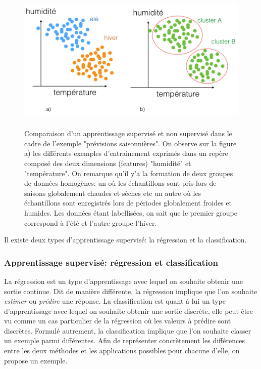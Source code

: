 \begin{figure}[h]
	\centering\includegraphics[height=7cm]{images/apprentissage_meteo.jpeg}
	\caption[Comparaison d'un apprentissage supervisé et non supervisé dans le cadre de l'exemple "prévisions saisonnières"]{Comparaison d'un apprentissage supervisé et non supervisé dans le cadre de l'exemple "prévisions saisonnières". On observe sur la figure a) les différents exemples d'entrainement exprimés dans un repère composé des deux dimensions (features) "humidité" et "température". On remarque qu'il y'a la formation de deux groupes de données homogènes: un où les échantillons sont pris lors de saisons globalement chaudes et sèches etc un autre où les échantillons sont enregistrés lors de périodes globalement froides et humides. Les données étant labellisées, on sait que le premier groupe correspond à l'été et l'autre groupe l'hiver.}
	\label{fig:Comparaison d'un apprentissage supervisé et non supervisé dans le cadre de l'exemple prévision saisonnières}
\end{figure}

Il existe deux types d'apprentissage supervisé: la régression et la classification.

\subsubsection{Apprentissage supervisé: régression et classification} 
\label{Le Machine Learning: Généralités sur le Machine Learning: Le modèle:Regression et classification}
 La régression est un type d'apprentissage avec lequel on souhaite obtenir une sortie continue. Dit de manière différente, la régression implique que l'on souhaite \emph{estimer} ou \emph{prédire} une réponse. 
La classification est quant à lui un type d'apprentissage avec lequel on souhaite obtenir une sortie discrète, elle peut être vu comme un cas particulier de la régression où les valeurs à prédire sont discrètes. Formulé autrement, la classification implique que l'on souhaite classer un exemple parmi différentes. Afin de représenter concrètement les différences entre les deux méthodes et les applications possibles pour chacune d'elle, on propose un exemple.

